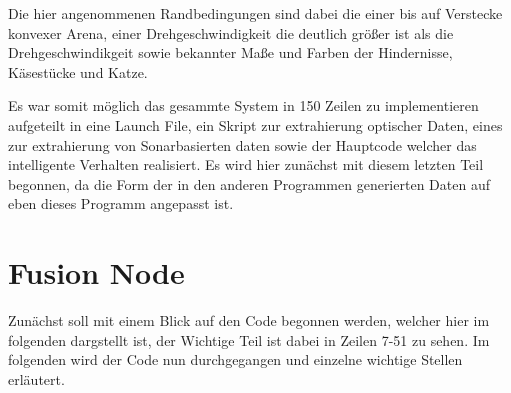 \documentclass[11pt,a4paper]{article}
\begin{document}
Die hier angenommenen Randbedingungen sind dabei die einer bis auf Verstecke konvexer Arena, einer Drehgeschwindigkeit die deutlich größer ist als die Drehgeschwindikgeit sowie bekannter Maße und Farben der Hindernisse, Käsestücke und Katze.

Es war somit möglich das gesammte System in 150 Zeilen zu implementieren aufgeteilt in eine Launch File, ein Skript zur extrahierung optischer Daten, eines zur extrahierung von Sonarbasierten daten sowie der Hauptcode welcher das intelligente Verhalten realisiert.
Es wird hier zunächst mit diesem letzten Teil begonnen, da die Form der in den anderen Programmen generierten Daten auf eben dieses Programm angepasst ist.
\newpage
\section{Fusion Node}
Zunächst soll mit einem Blick auf den Code begonnen werden, welcher hier im folgenden dargstellt ist, der Wichtige Teil ist dabei in Zeilen 7-51 zu sehen.
Im folgenden wird der Code nun durchgegangen und einzelne wichtige Stellen erläutert.
\end{document}
